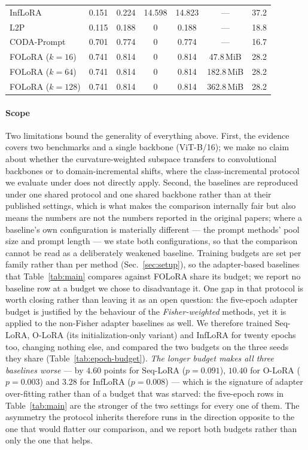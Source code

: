 \begin{table}[tbp]
\begin{tabular}{@{}lcccc@{\hspace{5pt}}cc@{}}
InfLoRA       & 0.151 & 0.224 & 14.598 & 14.823 & --- & 37.2 \\
L2P           & 0.115 & 0.188 & 0     & 0.188  & --- & 18.8 \\
CODA-Prompt   & 0.701 & 0.774 & 0     & 0.774  & --- & 16.7 \\
FOLoRA ($k{=}16$) & 0.741 & 0.814 & 0 & 0.814 & 47.8\,MiB & 28.2 \\
FOLoRA ($k{=}64$) & 0.741 & 0.814 & 0 & 0.814 & 182.8\,MiB & 28.2 \\
FOLoRA ($k{=}128$) & 0.741 & 0.814 & 0 & 0.814 & 362.8\,MiB & 28.2 \\
\bottomrule
\end{tabular}
\end{table}

\paragraph{Scope}
Two limitations bound the generality of everything above. First, the evidence covers two
benchmarks and a single backbone (ViT-B/16); we make no claim about whether the
curvature-weighted subspace transfers to convolutional backbones or to domain-incremental
shifts, where the class-incremental protocol we evaluate under does not directly apply.
Second, the baselines are reproduced under one shared protocol and one shared backbone
rather than at their published settings, which is what makes the comparison internally
fair but also means the numbers are not the numbers reported in the original papers; where
a baseline's own configuration is materially different --- the prompt methods' pool size
and prompt length --- we state both configurations, so that the comparison cannot be read
as a deliberately weakened baseline. Training budgets are set per family rather than per
method (Sec.~\ref{sec:setup}), so the adapter-based baselines that
Table~\ref{tab:main} compares against FOLoRA share its budget; we report no baseline row at
a budget we chose to disadvantage it. One gap in that protocol is worth closing rather than
leaving it as an open question: the five-epoch adapter budget is justified by the behaviour
of the \emph{Fisher-weighted} methods, yet it is applied to the non-Fisher adapter baselines
as well. We therefore trained Seq-LoRA, O-LoRA (its initialization-only variant) and InfLoRA for
twenty epochs too, changing nothing else, and compared the two budgets on the three seeds
they share
(Table~\ref{tab:epoch-budget}). \emph{The longer budget makes all three baselines worse} ---
by $4.60$ points for Seq-LoRA ($p=0.091$), $10.40$ for O-LoRA ($p=0.003$) and $3.28$ for
InfLoRA ($p=0.008$) --- which is the signature of adapter over-fitting rather than of a
budget that was starved: the five-epoch rows in Table~\ref{tab:main} are the stronger of the
two settings for every one of them. The asymmetry the protocol inherits therefore runs in
the direction opposite to the one that would flatter our comparison, and we report both
budgets rather than only the one that helps.

